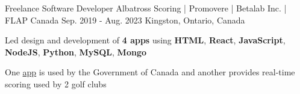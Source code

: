 \begin{cventries}
  \cventry
    {Freelance Software Developer} %
    {Albatross Scoring | Promovere | Betalab Inc. | FLAP Canada} %
    {Sep. 2019 - Aug. 2023} %
    {Kingston, Ontario, Canada} %
    {
      \begin{cvitems} %
        \item{Led design and development of \textbf{4 apps} using \textbf{HTML}, \textbf{React}, \textbf{JavaScript}, \textbf{NodeJS}, \textbf{Python}, \textbf{MySQL}, \textbf{Mongo}}
        \item{One \href{https://www.flapapp.ca/}{app} is used by the Government of Canada and another provides real-time scoring used by 2 golf clubs}

\end{cvitems}}
\end{cventries}
